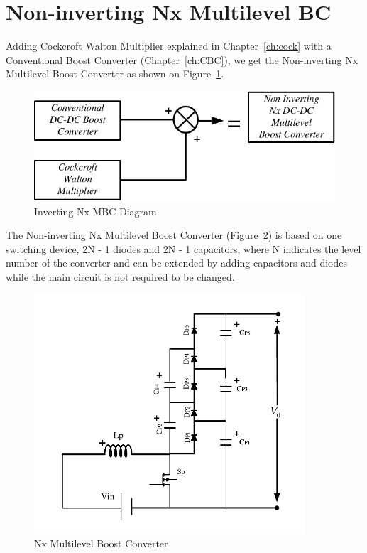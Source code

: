 \section{Non-inverting Nx Multilevel BC}\label{ch:MBC}

Adding Cockcroft Walton Multiplier explained in Chapter~\ref{ch:cock} with a Conventional Boost Converter (Chapter~\ref{ch:CBC}), we get the Non-inverting Nx Multilevel Boost Converter as shown on Figure~\ref{fig:MBC_CW_CBCtoNx}. \cite{Bhaskar2016}

\begin{figure}[H]
   \centering
   \includegraphics[width=\textwidth]{figures/yMultilevel/CW_CBCtoNx.pdf}
   \caption{Inverting Nx MBC Diagram}
	\label{fig:MBC_CW_CBCtoNx}
\end{figure}


The Non-inverting Nx Multilevel Boost Converter (Figure~\ref{fig:MBC_3XFULL}) is based on one switching device, 2N - 1 diodes and 2N - 1 capacitors, where N indicates the level number of the converter and can be extended by adding capacitors and diodes while the main circuit is not required to be changed. \cite{Rosas-Caro2008}

\begin{figure}[H]
   \centering
   \includegraphics[width=0.9\textwidth]{figures/yMultilevel/3x_FULL.pdf}
    \caption{Nx Multilevel Boost Converter}
	\label{fig:MBC_3XFULL}
\end{figure}

